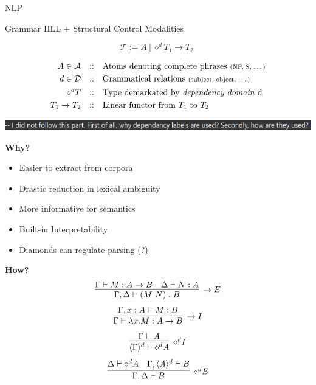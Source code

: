 \documentclass{beamer}
\begin{document}
\begin{frame}{NLP}

	\begin{block}{Grammar}
		IILL + Structural Control Modalities
	\end{block}
	\vfill	
	
	\[
		\mathcal{T} := A \ | \ \diamond^d{T}_1 \to T_2 \
	\]
	\vfill 
	
	\begin{align*}
		A \in \mathcal{A} &{\quad::\quad} 
			\text{Atoms denoting complete phrases \scriptsize {(NP, S, \dots)}}\\
		d \in \mathcal{D} &{\quad::\quad}  
			\text{Grammatical relations \scriptsize{(subject, object, \dots)}} \\
		\diamond^dT &{\quad::\quad} 
			\text{Type demarkated by \textit{dependency domain} d}\\
		T_1 \to T_2 &{\quad::\quad} 
			\text{Linear functor from $T_1$ to $T_2$}
	\end{align*}
\end{frame}


\begin{frame}{	\includegraphics[keepaspectratio,width=\textwidth]{but_why.png}	}
	
	\textbf{Why?}
	\begin{itemize}
		\item Easier to extract from corpora
		\item Drastic reduction in lexical ambiguity
		\item More informative for semantics
		\item Built-in Interpretability
		\item Diamonds can regulate parsing (?)
	\end{itemize}\vfill	
	
	\pause
	\textbf{How?}
	\small
		\begin{equation*}
			\infer[\to  E]{\Gamma,\Delta\vdash (M\ N): {B}}{\Gamma\vdash M: A \to {B} & \Delta\vdash N: {A}}
		\end{equation*}
		\begin{equation*}
		    \infer[\to I]{\Gamma \vdash \lambda x.M: {A}\to {B}}{\Gamma, x: {A} \vdash M: {B}}
		\end{equation*}
		\begin{equation*}
		    \infer[\diamond^d I]{\langle \Gamma \rangle^d \vdash \diamond^d {A}}{\Gamma \vdash {A}}
		\end{equation*}
		\begin{equation*}
			\infer[\diamond^d E]{\Gamma,\Delta \vdash {B}}{\Delta \vdash \diamond^d {A}
			&
			\Gamma,\langle {A} \rangle^d \vdash {B}}
		\end{equation*}	
\end{frame}
\end{document}

